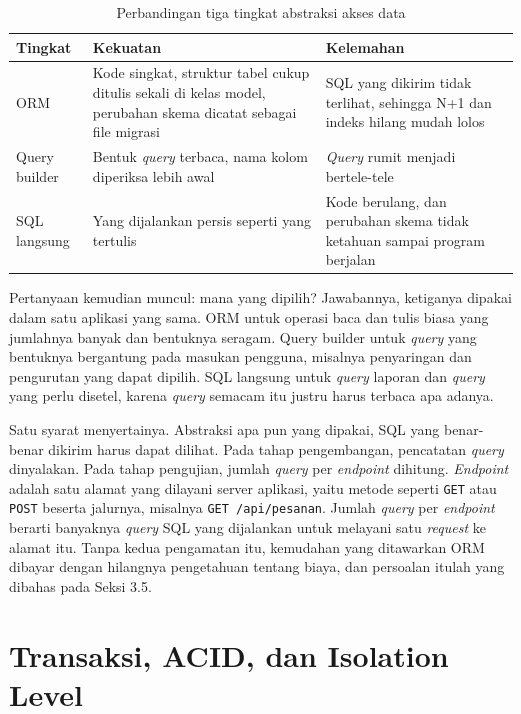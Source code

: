 \begin{table}[!htb]
  \centering
  \caption{Perbandingan tiga tingkat abstraksi akses data}
  \label{tab:abstraksi}
  \begin{tabularx}{\textwidth}{lXX}
    \hline
    \textbf{Tingkat} & \textbf{Kekuatan} & \textbf{Kelemahan} \\
    \hline
    ORM & Kode singkat, struktur tabel cukup ditulis sekali di kelas model, perubahan skema dicatat sebagai file migrasi & SQL yang dikirim tidak terlihat, sehingga N+1 dan indeks hilang mudah lolos \\
    \hline
    Query builder & Bentuk \textit{query} terbaca, nama kolom diperiksa lebih awal & \textit{Query} rumit menjadi bertele-tele \\
    \hline
    SQL langsung & Yang dijalankan persis seperti yang tertulis & Kode berulang, dan perubahan skema tidak ketahuan sampai program berjalan \\
    \hline
  \end{tabularx}
\end{table}

Pertanyaan kemudian muncul: mana yang dipilih? Jawabannya, ketiganya dipakai
dalam satu aplikasi yang sama. ORM untuk operasi baca dan tulis biasa yang
jumlahnya banyak dan bentuknya seragam. Query builder untuk \textit{query} yang
bentuknya bergantung pada masukan pengguna, misalnya penyaringan dan
pengurutan yang dapat dipilih. SQL langsung untuk \textit{query} laporan dan \textit{query} yang
perlu disetel, karena \textit{query} semacam itu justru harus terbaca apa adanya.

Satu syarat menyertainya. Abstraksi apa pun yang dipakai, SQL yang benar-benar
dikirim harus dapat dilihat. Pada tahap pengembangan, pencatatan \textit{query}
dinyalakan. Pada tahap pengujian, jumlah \textit{query} per \textit{endpoint} dihitung.
\textit{Endpoint} adalah satu alamat yang dilayani server aplikasi, yaitu
metode seperti \texttt{GET} atau \texttt{POST} beserta jalurnya, misalnya
\texttt{GET /api/pesanan}. Jumlah \textit{query} per \textit{endpoint} berarti banyaknya
\textit{query} SQL yang dijalankan untuk melayani satu \textit{request} ke alamat itu.
Tanpa kedua pengamatan itu, kemudahan yang ditawarkan ORM dibayar dengan hilangnya pengetahuan
tentang biaya, dan persoalan itulah yang dibahas pada Seksi 3.5.

\section{Transaksi, ACID, dan Isolation Level}

